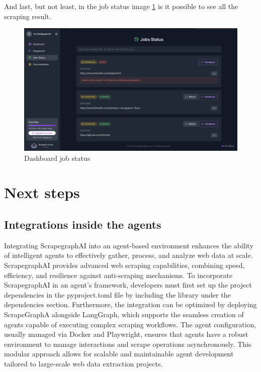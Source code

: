 And last, but not least, in the job status image \ref{fig:enter-dashboard-status} is it possible to see all the scraping result.
\begin{figure}[H]
    \centering
    \includegraphics[width=0.95\linewidth]{Assets/dashboard_3.png}
    \caption{Dashboard job status}
    \label{fig:enter-dashboard-status}
\end{figure}

\section{Next steps}
\subsection{Integrations inside the agents}
Integrating ScrapegraphAI  into an agent-based environment enhances the ability of intelligent agents to effectively gather, process, and analyze web data at scale. ScrapegraphAI  provides advanced web scraping capabilities, combining speed, efficiency, and resilience against anti-scraping mechanisms. To incorporate ScrapegraphAI  in an agent's framework, developers must first set up the project dependencies in the pyproject.toml file by including the library under the dependencies section. Furthermore, the integration can be optimized by deploying ScrapeGraphA alongside LangGraph, which supports the seamless creation of agents capable of executing complex scraping workflows. The agent configuration, usually managed via Docker and Playwright, ensures that agents have a robust environment to manage interactions and scrape operations asynchronously. This modular approach allows for scalable and maintainable agent development tailored to large-scale web data extraction projects.

